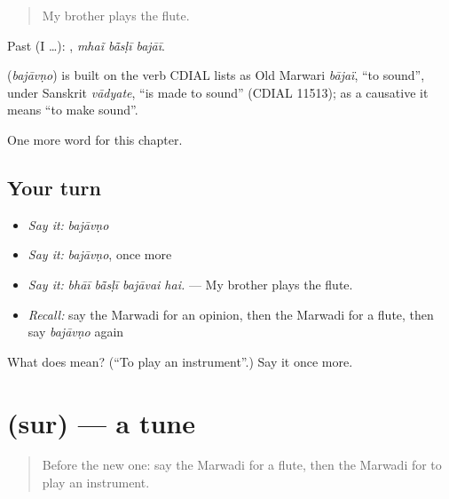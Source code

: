 \begin{quote}
My brother plays the flute.
\end{quote}

Past (I …):   , \emph{mhaĩ bā̃sḷī bajāī}.

\begin{cousinweb}
\textbf{} (\emph{bajāvṇo}) is built on the verb CDIAL lists as Old Marwari \emph{bājaï}, \textquotedblleft{}to sound\textquotedblright{}, under Sanskrit \emph{vādyate}, \textquotedblleft{}is made to sound\textquotedblright{} (CDIAL 11513); as a causative it means \textquotedblleft{}to make sound\textquotedblright{}.
\end{cousinweb}

\begin{grammarlens}[title={What you've built}]
One more word for this chapter.
\end{grammarlens}

\subsection*{Your turn}
\begin{itemize}
\raggedright
  \item \emph{Say it:} \emph{bajāvṇo}
  \item \emph{Say it:} \emph{bajāvṇo}, once more
  \item \emph{Say it:} \emph{bhāī bā̃sḷī bajāvai hai.} — My brother plays the flute.
  \item \emph{Recall:} say the Marwadi for an opinion, then the Marwadi for a flute, then say \emph{bajāvṇo} again
\end{itemize}

\begin{tcolorbox}[breakable,colback=teal!4,colframe=teal!35!black,title={Before you move on}]
What does  mean? (\textquotedblleft{}To play an instrument\textquotedblright{}.) Say it once more.
\end{tcolorbox}
\section[\texorpdfstring{\mw{सुर} (sur)}{सुर (sur)}]{ (sur) — a tune}

\label{lesson:MW-C276-sur}



\begin{quote}
Before the new one: say the Marwadi for a flute, then the Marwadi for to play an instrument.
\end{quote}


